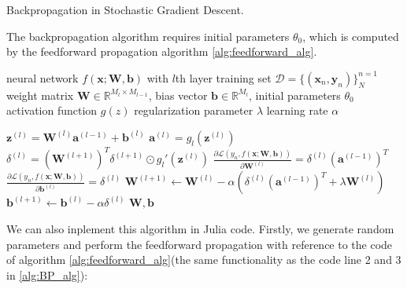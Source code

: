 \documentclass[
	parskip, 			   %
	twoside, 			   %
	DIV=14, 			   %
	BCOR=15.0mm, 		   %
	headsepline, 		   %
	open=right, 		   %
	captions=tableheading, %
	bibliography=totoc,    %
	numbers=noenddot       %
]{scrreprt}
\begin{document}
\clearpage
\begin{algorithm}[h!]
\caption{Backpropagation in Stochastic Gradient Descent.}
The backpropagation algorithm requires initial parameters $\theta_{0}$, which is computed by the feedforward propagation algorithm \ref{alg:feedforward_alg}.
\label{alg:BP_alg}
    \begin{algorithmic}[1]
    \Require neural network $f(\mathbf{x};\mathbf{W},\mathbf{b})$ with $l$th layer
    \Require training set $\mathcal{D}=\{(\mathbf{x}_{n}, \mathbf{y}_{n})\}_{N}^{n=1}$
    \Require weight matrix $\mathbf{W} \in \mathbb{R}^{M_{l} \times M_{l-1}}$, bias vector $\mathbf{b} \in \mathbb{R}^{M_{l}}$, initial parameters $\theta_{0}$
    \Require activation function $g(z)$
    \Require regularization parameter $\lambda$
    \Require learning rate $\alpha$

        \State $\mathbf{z}^{(l)} = \mathbf{W}^{(l)} \mathbf{a}^{(l-1)} + \mathbf{b}^{(l)}$ 
        \State $\mathbf{a}^{(l)} = g_{l}(\mathbf{z}^{(l)})$ 
        \State {}
        \State $\delta^{(l)} = (\mathbf{W}^{(l+1)})^T \delta^{(l+1)} \odot g_{l}'(\mathbf{z}^{(l)})$ 
        \State {}
        \State $\frac{\partial \mathcal{L}\left( y_n,f(\mathbf{x};\mathbf{\mathbf{W},\mathbf{b}}) \right)}{\partial \mathbf{W}^{(l)}} = \delta^{(l)} (\mathbf{a}^{(l-1)})^T$ 
        \State $\frac{\partial \mathcal{L}\left( y_n,f(\mathbf{x};\mathbf{\mathbf{W},\mathbf{b}}) \right)}{\partial \mathbf{b}^{(l)}} = \delta^{(l)}$ 
        \State {}
        \State $\mathbf{W}^{(l+1)} \gets  \mathbf{W}^{(l)}-\alpha (\delta^{(l)} (\mathbf{a}^{(l-1)})^T + \lambda \mathbf{W}^{(l)})$ 
        \State $\mathbf{b}^{(l+1)} \gets  \mathbf{b}^{(l)}-\alpha \delta^{(l)}$ 
        \State {}
    \EndFor
    \State \Return $\mathbf{W}, \mathbf{b}$ 
    \end{algorithmic}
\end{algorithm}

We can also inplement this algorithm in Julia code. Firstly, we generate random parameters and perform the feedforward propagation with reference to the code of algorithm \ref{alg:feedforward_alg}(the same functionality as the code line 2 and 3 in \ref{alg:BP_alg}):
\end{document}
